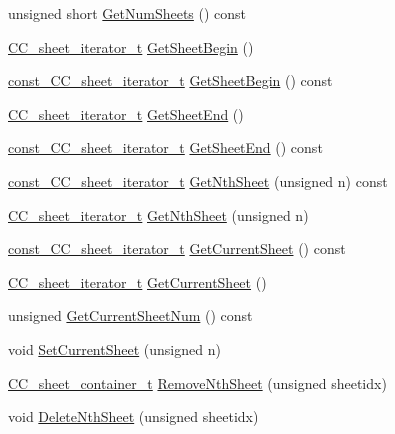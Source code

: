 \begin{DoxyCompactItemize}
\item 
unsigned short \hyperlink{a00020_a30d9d301120a9403df378ee303aebf59}{Get\-Num\-Sheets} () const 
\item 
\hyperlink{a00020_a36548f14d6c85b0abee6f2956dbe4689}{C\-C\-\_\-sheet\-\_\-iterator\-\_\-t} \hyperlink{a00020_a22498e3126c272da81dcc1d0fa182910}{Get\-Sheet\-Begin} ()
\item 
\hyperlink{a00020_a40ea5298b58fb5f3b5f648e6ef36a286}{const\-\_\-\-C\-C\-\_\-sheet\-\_\-iterator\-\_\-t} \hyperlink{a00020_a7fb89b997fae2ae0289ecd27726aa575}{Get\-Sheet\-Begin} () const 
\item 
\hyperlink{a00020_a36548f14d6c85b0abee6f2956dbe4689}{C\-C\-\_\-sheet\-\_\-iterator\-\_\-t} \hyperlink{a00020_ac78d213242b2e2ef3d325408e9b1e833}{Get\-Sheet\-End} ()
\item 
\hyperlink{a00020_a40ea5298b58fb5f3b5f648e6ef36a286}{const\-\_\-\-C\-C\-\_\-sheet\-\_\-iterator\-\_\-t} \hyperlink{a00020_a674bbc27dcb20e531990f0cd805af30f}{Get\-Sheet\-End} () const 
\item 
\hyperlink{a00020_a40ea5298b58fb5f3b5f648e6ef36a286}{const\-\_\-\-C\-C\-\_\-sheet\-\_\-iterator\-\_\-t} \hyperlink{a00020_a216aa095052dd49768df6f3cd2081c0f}{Get\-Nth\-Sheet} (unsigned n) const 
\item 
\hyperlink{a00020_a36548f14d6c85b0abee6f2956dbe4689}{C\-C\-\_\-sheet\-\_\-iterator\-\_\-t} \hyperlink{a00020_a376aafc4d2807f46224a1d22bf53c19c}{Get\-Nth\-Sheet} (unsigned n)
\item 
\hyperlink{a00020_a40ea5298b58fb5f3b5f648e6ef36a286}{const\-\_\-\-C\-C\-\_\-sheet\-\_\-iterator\-\_\-t} \hyperlink{a00020_ad5fc3c4cd218407e379fa46e035c4468}{Get\-Current\-Sheet} () const 
\item 
\hyperlink{a00020_a36548f14d6c85b0abee6f2956dbe4689}{C\-C\-\_\-sheet\-\_\-iterator\-\_\-t} \hyperlink{a00020_a22e2a3326eb62ee50daca0b206d72da5}{Get\-Current\-Sheet} ()
\item 
unsigned \hyperlink{a00020_a615c0173959b086005891bef66f51ced}{Get\-Current\-Sheet\-Num} () const 
\item 
void \hyperlink{a00020_ae455fd80d3ee97a29789d238801a60bb}{Set\-Current\-Sheet} (unsigned n)
\item 
\hyperlink{a00020_ab378b0e2a08984cfda6487b5161e520c}{C\-C\-\_\-sheet\-\_\-container\-\_\-t} \hyperlink{a00020_a852e785dd0b4ea390a795ed900aaf8cd}{Remove\-Nth\-Sheet} (unsigned sheetidx)
\item 
void \hyperlink{a00020_a3db922015ff5d01bd29f6b779632e0b0}{Delete\-Nth\-Sheet} (unsigned sheetidx)

\end{DoxyCompactItemize}
